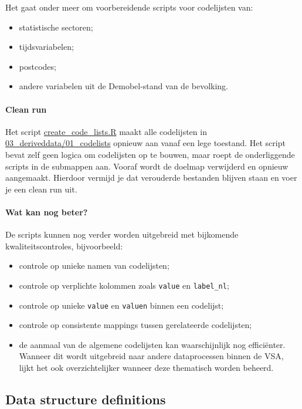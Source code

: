 \documentclass{VSAnote}
\begin{document}
Het gaat onder meer om voorbereidende scripts voor codelijsten van:
\begin{itemize}[nosep]
\item statistische sectoren;
\item tijdsvariabelen;
\item postcodes;
\item andere variabelen uit de Demobel-stand van de bevolking.
\end{itemize}


\paragraph{Clean run}

Het script \url{create_code_lists.R} maakt alle codelijsten in \url{03_deriveddata/01_codelists} opnieuw aan vanaf een lege toestand. Het script bevat zelf geen logica om codelijsten op te bouwen, maar roept de onderliggende scripts in de submappen aan. Vooraf wordt de doelmap verwijderd en opnieuw aangemaakt. Hierdoor vermijd je dat verouderde bestanden blijven staan en voer je een clean run uit.


\paragraph{Wat kan nog beter?}

De scripts kunnen nog verder worden uitgebreid met bijkomende kwaliteitscontroles, bijvoorbeeld:
\begin{itemize}[nosep]
\item controle op unieke namen van codelijsten;
\item controle op verplichte kolommen zoals \verb+value+ en \verb+label_nl+;
\item controle op unieke \verb+value+ en \verb+valuen+ binnen een codelijst;
\item controle op consistente mappings tussen gerelateerde codelijsten;
\item de aanmaal van de algemene codelijsten kan waarschijnlijk nog efficiënter. Wanneer dit wordt uitgebreid naar andere dataprocessen binnen de VSA, lijkt het ook overzichtelijker wanneer deze thematisch worden beheerd.
\end{itemize}





\subsection{Data structure definitions}
\end{document}
